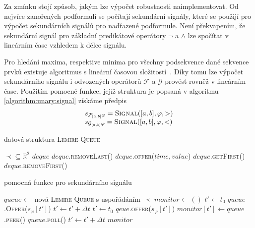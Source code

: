 Za zmínku stojí způsob, jakým lze výpočet robustnosti naimplementovat. Od nejvíce zanořených
podformulí se počítají sekundární signály, které se použijí pro výpočet sekundárních signálů
pro nadřazené podformule. Není překvapením, že sekundární signál pro základní predikátové operátory
$\neg$ a $\wedge$ lze spočítat v lineárním čase vzhledem k délce signálu.

Pro hledání maxima,
respektive minima pro všechny podsekvence dané sekvence prvků existuje algoritmus s lineární časovou složitostí~\cite{lemire2006}. Díky tomu lze
výpočet sekundárního signálu i odvozených operátorů $\mathcal{F}$ a $\mathcal{G}$ pro\-vést
rovněž v lineárním čase. Použitím pomocné funkce, jejíž struktura je popsaná v algoritmu \ref{algorithm:unary:signal}
získáme předpis 
\begin{align}\label{eq:future:gloabally:robustness:impl}
\begin{array}{ll}
s_{\mathcal{F}_{[a,b]}\varphi} = \textsc{Signal}([a,b], \varphi, >)				\\
s_{\mathcal{G}_{[a,b]}\varphi} = \textsc{Signal}([a,b], \varphi, <)
\end{array}
\end{align}

\begin{algorithm}
\caption{datová struktura \textsc{Lemire-Queue}\cite{lemire2006}}
\begin{algorithmic}[1]
\Require 	$\prec \subseteq \mathbb{R}^2$ 
\State $deque$ 
		\State $deque$.\textsc{removeLast()}
	\EndWhile
	\State $deque$.\textsc{offer(}$time, value$\textsc{)}
\EndFunction
{}
	\State\Return $deque$.\textsc{getFirst()}
\EndFunction
{}
	\State\Return $deque$.\textsc{removeFirst()}
\EndFunction
\end{algorithmic}
\end{algorithm}

\begin{algorithm}\label{algorithm:unary:signal}
\caption{pomocná funkce pro sekundárního signálu}
\begin{algorithmic}[1]
	\State	$queue \gets $ nová \textsc{Lemire-Queue} s uspořádáním $\prec$
	\State	$monitor \gets ()$
	\State	$t' \gets t_0$
		\State $queue$.\textsc{Offer}($s_\varphi[t']$)
		\State $t' \gets t' + \Delta t$
	\EndWhile
	\State	$t' \gets t_0$
		\State	$qeue$.\textsc{offer}($s_\varphi[t']$)
		\State	$monitor[t'] \gets queue$.\textsc{peek()}
			\State	$queue$.\textsc{poll()}
		\EndIf
		\State	$t' \gets t' + \Delta t$
	\EndWhile
	\State\Return $monitor$
\EndFunction
\end{algorithmic}
\end{algorithm}

